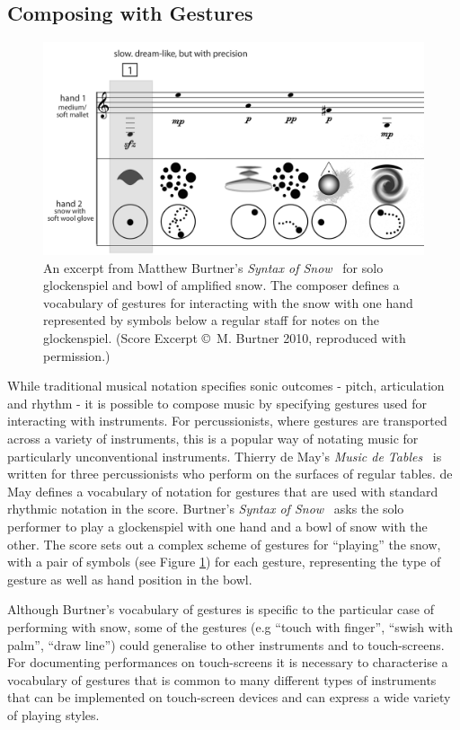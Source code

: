 \documentclass[graybox]{svmult}
\begin{document}
\subsection{Composing with Gestures}
\label{subsec:composing-gestures}

\begin{figure}
\begin{center}
\includegraphics[width=0.7\columnwidth]{figures/syntaxofsnow-excerpt-bw}
\end{center}
\caption{An excerpt from Matthew Burtner's \emph{Syntax of
    Snow}~\cite{Burtner:2011fk} for solo glockenspiel and bowl of
  amplified snow. The composer defines a vocabulary of gestures for
  interacting with the snow with one hand represented by symbols below
  a regular staff for notes on the glockenspiel. (Score Excerpt \copyright~M.
  Burtner 2010, reproduced with permission.)}
\label{fig:SyntaxOfSnow}
\end{figure}

While traditional musical notation specifies sonic outcomes - pitch,
articulation and rhythm - it is possible to compose music by
specifying gestures used for interacting with instruments. For
percussionists, where gestures are transported across a variety of
instruments, this is a popular way of notating music for particularly
unconventional instruments. Thierry de May's \emph{Music
de Tables}~\cite{May:1987fk} is written for three percussionists who
perform on the surfaces of regular tables. de May defines a vocabulary
of notation for gestures that are used with standard rhythmic notation
in the score. Burtner's \emph{Syntax of Snow}~\cite{Burtner:2011fk}
asks the solo performer to play a glockenspiel with one hand and a
bowl of snow with the other. The score sets out a complex scheme of
gestures for ``playing'' the snow, with a pair of symbols (see Figure
\ref{fig:SyntaxOfSnow}) for each gesture, representing the type of
gesture as well as hand position in the bowl. 

Although Burtner's vocabulary of gestures is specific to the
particular case of performing with snow, some of the gestures (e.g
``touch with finger'', ``swish with palm'', ``draw line'') could
generalise to other instruments and to touch-screens. For documenting
performances on touch-screens it is necessary to characterise a
vocabulary of gestures that is common to many different types of
instruments that can be implemented on touch-screen devices and can
express a wide variety of playing styles.
\end{document}
